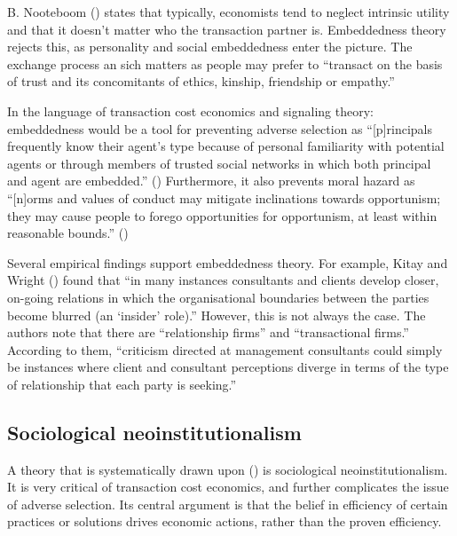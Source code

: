\documentclass[
  man,floatsintext]{apa6}
\begin{document}
B. Nooteboom () states that typically, economists tend to neglect intrinsic utility and that it doesn't matter who the transaction partner is. Embeddedness theory rejects this, as personality and social embeddedness enter the picture. The exchange process an sich matters as people may prefer to ``transact on the basis of trust and its concomitants of ethics, kinship, friendship or empathy.''

In the language of transaction cost economics and signaling theory: embeddedness would be a tool for preventing adverse selection as ``{[}p{]}rincipals frequently know their agent's type because of personal familiarity with potential agents or through members of trusted social networks in which both principal and agent are embedded.'' () Furthermore, it also prevents moral hazard as ``{[}n{]}orms and values of conduct may mitigate inclinations towards opportunism; they may cause people to forego opportunities for opportunism, at least within reasonable bounds.'' ()

Several empirical findings support embeddedness theory. For example, Kitay and Wright () found that ``in many instances consultants and clients develop closer, on-going relations in which the organisational boundaries between the parties become blurred (an `insider' role).'' However, this is not always the case. The authors note that there are ``relationship firms'' and ``transactional firms.'' According to them, ``criticism directed at management consultants could simply be instances where client and consultant perceptions diverge in terms of the type of relationship that each party is seeking.''

\subsection{Sociological neoinstitutionalism}\label{sociological-neoinstitutionalism}

A theory that is systematically drawn upon () is sociological neoinstitutionalism. It is very critical of transaction cost economics, and further complicates the issue of adverse selection. Its central argument is that the belief in efficiency of certain practices or solutions drives economic actions, rather than the proven efficiency.
\end{document}

